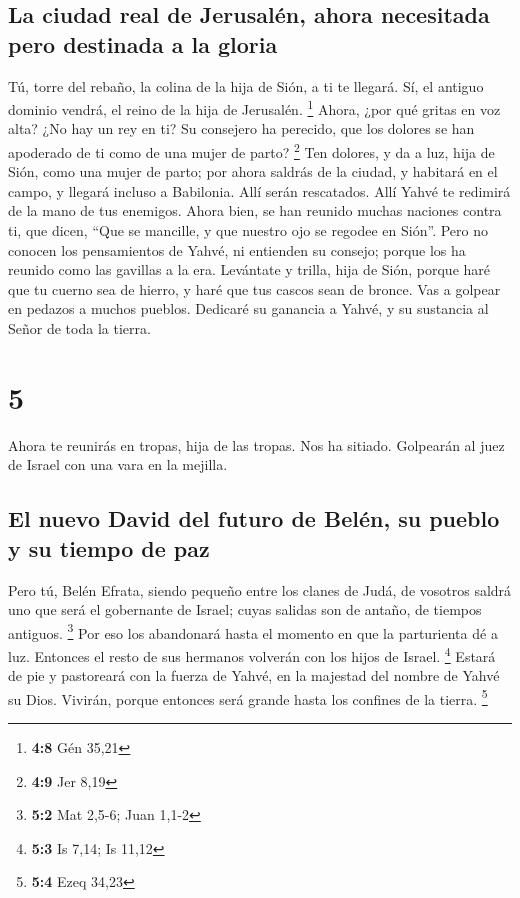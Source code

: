 \hypertarget{la-ciudad-real-de-jerusaluxe9n-ahora-necesitada-pero-destinada-a-la-gloria}{%
\subsection{La ciudad real de Jerusalén, ahora necesitada pero destinada
a la
gloria}\label{la-ciudad-real-de-jerusaluxe9n-ahora-necesitada-pero-destinada-a-la-gloria}}

 Tú, torre del rebaño, la colina de la hija de Sión, a ti
te llegará. Sí, el antiguo dominio vendrá, el reino de la hija de
Jerusalén. \footnote{\textbf{4:8} Gén 35,21}  Ahora, ¿por
qué gritas en voz alta? ¿No hay un rey en ti? Su consejero ha perecido,
que los dolores se han apoderado de ti como de una mujer de parto?
\footnote{\textbf{4:9} Jer 8,19}  Ten dolores, y da a
luz, hija de Sión, como una mujer de parto; por ahora saldrás de la
ciudad, y habitará en el campo, y llegará incluso a Babilonia. Allí
serán rescatados. Allí Yahvé te redimirá de la mano de tus enemigos.
 Ahora bien, se han reunido muchas naciones contra ti,
que dicen, ``Que se mancille, y que nuestro ojo se regodee en Sión''.
 Pero no conocen los pensamientos de Yahvé, ni entienden
su consejo; porque los ha reunido como las gavillas a la era.
 Levántate y trilla, hija de Sión, porque haré que tu
cuerno sea de hierro, y haré que tus cascos sean de bronce. Vas a
golpear en pedazos a muchos pueblos. Dedicaré su ganancia a Yahvé, y su
sustancia al Señor de toda la tierra.

\hypertarget{section-4}{%
\section{5}\label{section-4}}

 Ahora te reunirás en tropas, hija de las tropas. Nos ha
sitiado. Golpearán al juez de Israel con una vara en la mejilla.

\hypertarget{el-nuevo-david-del-futuro-de-beluxe9n-su-pueblo-y-su-tiempo-de-paz}{%
\subsection{El nuevo David del futuro de Belén, su pueblo y su tiempo de
paz}\label{el-nuevo-david-del-futuro-de-beluxe9n-su-pueblo-y-su-tiempo-de-paz}}

 Pero tú, Belén Efrata, siendo pequeño entre los clanes de
Judá, de vosotros saldrá uno que será el gobernante de Israel; cuyas
salidas son de antaño, de tiempos antiguos. \footnote{\textbf{5:2} Mat
  2,5-6; Juan 1,1-2}  Por eso los abandonará hasta el
momento en que la parturienta dé a luz. Entonces el resto de sus
hermanos volverán con los hijos de Israel. \footnote{\textbf{5:3} Is
  7,14; Is 11,12}  Estará de pie y pastoreará con la
fuerza de Yahvé, en la majestad del nombre de Yahvé su Dios. Vivirán,
porque entonces será grande hasta los confines de la tierra. \footnote{\textbf{5:4}
  Ezeq 34,23}

